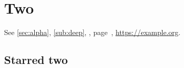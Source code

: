 \chapter{Two}\label{ch:two}
See \ref{sec:alpha}, \autoref{sub:deep}, , page~\pageref{sec:gamma}, \url{https://example.org}.
\section*{Starred two}
